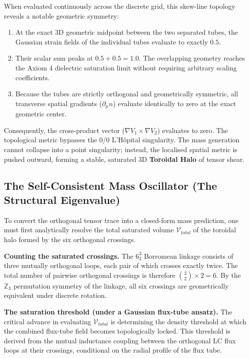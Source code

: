 When evaluated continuously across the discrete grid, this skew-line topology reveals a notable geometric symmetry:
\begin{enumerate}
    \item At the exact 3D geometric midpoint between the two separated tubes, the Gaussian strain fields of the individual tubes evaluate to exactly $0.5$. 
    \item Their scalar sum peaks at $0.5 + 0.5 = \mathbf{1.0}$. The overlapping geometry reaches the Axiom 4 dielectric saturation limit without requiring arbitrary scaling coefficients.
    \item Because the tubes are strictly orthogonal and geometrically symmetric, all transverse spatial gradients ($\partial_\mu n$) evaluate identically to zero at the exact geometric center.
\end{enumerate}

Consequently, the cross-product vector ($\nabla V_1 \times \nabla V_2$) evaluates to zero. The topological metric bypasses the $0/0$ L'Hôpital singularity. The mass generation cannot collapse into a point singularity; instead, the localised spatial metric is pushed outward, forming a stable, saturated 3D \textbf{Toroidal Halo} of tensor shear.

\subsection{The Self-Consistent Mass Oscillator (The Structural Eigenvalue)}
To convert the orthogonal tensor trace into a closed-form mass prediction, one must first analytically resolve the total saturated volume $\mathcal{V}_{total}$ of the toroidal halo formed by the six orthogonal crossings.

\textbf{Counting the saturated crossings.} The $6^3_2$ Borromean linkage consists of three mutually orthogonal loops, each pair of which crosses exactly twice. The total number of pairwise orthogonal crossings is therefore $\binom{3}{2} \times 2 = 6$. By the $\mathbb{Z}_3$ permutation symmetry of the linkage, all six crossings are geometrically equivalent under discrete rotation.

\textbf{The saturation threshold (under a Gaussian flux-tube ansatz).} The critical advance in evaluating $\mathcal{V}_{total}$ is determining the density threshold at which the combined flux-tube field becomes topologically locked. This threshold is derived from the mutual inductance coupling between the orthogonal LC flux loops at their crossings, conditional on the radial profile of the flux tube.

